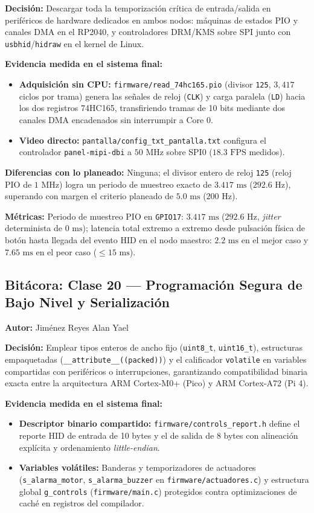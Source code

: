 \textbf{Decisión:} Descargar toda la temporización crítica de entrada/salida en periféricos de hardware dedicados en ambos nodos: máquinas de estados PIO y canales DMA en el RP2040, y controladores DRM/KMS sobre SPI junto con \texttt{usbhid}/\texttt{hidraw} en el kernel de Linux.

\textbf{Evidencia medida en el sistema final:}
\begin{itemize}
	\item \textbf{Adquisición sin CPU:} \texttt{firmware/read\_74hc165.pio} (divisor \texttt{125}, $3{,}417$ ciclos por trama) genera las señales de reloj (\texttt{CLK}) y carga paralela (\texttt{LD}) hacia los dos registros 74HC165, transfiriendo tramas de 10 bits mediante dos canales DMA encadenados sin interrumpir a Core 0.
	\item \textbf{Video directo:} \texttt{pantalla/config\_txt\_pantalla.txt} configura el controlador \texttt{panel-mipi-dbi} a $50\text{ MHz}$ sobre SPI0 ($18.3\text{ FPS}$ medidos).
\end{itemize}

\textbf{Diferencias con lo planeado:} Ninguna; el divisor entero de reloj \texttt{125} (reloj PIO de $1\text{ MHz}$) logra un periodo de muestreo exacto de $3.417\text{ ms}$ ($292.6\text{ Hz}$), superando con margen el criterio planeado de $5.0\text{ ms}$ ($200\text{ Hz}$).

\textbf{Métricas:} Periodo de muestreo PIO en \texttt{GPIO17}: $3.417\text{ ms}$ ($292.6\text{ Hz}$, \textit{jitter} determinista de $0\text{ ms}$); latencia total extremo a extremo desde pulsación física de botón hasta llegada del evento HID en el nodo maestro: $2.2\text{ ms}$ en el mejor caso y $7.65\text{ ms}$ en el peor caso ($\le 15\text{ ms}$).

\subsection{Bitácora: Clase 20 — Programación Segura de Bajo Nivel y Serialización}
\textbf{Autor:} Jiménez Reyes Alan Yael

\textbf{Decisión:} Emplear tipos enteros de ancho fijo (\texttt{uint8\_t}, \texttt{uint16\_t}), estructuras empaquetadas (\texttt{\_\_attribute\_\_((packed))}) y el calificador \texttt{volatile} en variables compartidas con periféricos o interrupciones, garantizando compatibilidad binaria exacta entre la arquitectura ARM Cortex-M0+ (Pico) y ARM Cortex-A72 (Pi 4).

\textbf{Evidencia medida en el sistema final:}
\begin{itemize}
	\item \textbf{Descriptor binario compartido:} \texttt{firmware/controls\_report.h} define el reporte HID de entrada de 10 bytes y el de salida de 8 bytes con alineación explícita y ordenamiento \textit{little-endian}.
	\item \textbf{Variables volátiles:} Banderas y temporizadores de actuadores (\texttt{s\_alarma\_motor}, \texttt{s\_alarma\_buzzer} en \texttt{firmware/actuadores.c}) y estructura global \texttt{g\_controls} (\texttt{firmware/main.c}) protegidos contra optimizaciones de caché en registros del compilador.
\end{itemize}

